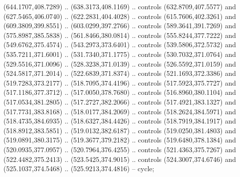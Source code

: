 \begin{scope}[shift={(407.03862,-246.29561)}]
    (644.1707,408.7289) .. (638.3173,408.1169) .. controls (632.8709,407.5577) and
    (627.5465,406.0740) .. (622.2831,404.4028) .. controls (615.7606,402.3261) and
    (609.3809,399.8551) .. (603.0299,397.2766) .. controls (589.3641,391.7269) and
    (575.8987,385.5838) .. (561.8466,380.0814) .. controls (555.8244,377.7222) and
    (549.6762,375.4574) .. (543.2973,373.6401) .. controls (539.5806,372.5732) and
    (535.7211,371.6001) .. (531.7340,371.1775) .. controls (530.7032,371.0764) and
    (529.5516,371.0096) .. (528.3238,371.0139) .. controls (526.5592,371.0159) and
    (524.5817,371.2014) .. (522.6839,371.8374) .. controls (521.1693,372.3386) and
    (519.7283,373.2177) .. (518.7095,374.4196) .. controls (517.5923,375.7727) and
    (517.1186,377.3712) .. (517.0050,378.7680) .. controls (516.8960,380.1104) and
    (517.0534,381.2805) .. (517.2727,382.2066) .. controls (517.4921,383.1327) and
    (517.7731,383.8168) .. (518.0177,384.2069) .. controls (518.2624,384.5971) and
    (518.4735,384.6935) .. (518.6327,384.4426) .. controls (518.7919,384.1917) and
    (518.8912,383.5851) .. (519.0132,382.6187) .. controls (519.0250,381.4803) and
    (519.0891,380.3175) .. (519.3677,379.2182) .. controls (519.6480,378.1384) and
    (520.0935,377.0957) .. (520.7964,376.4255) .. controls (521.4363,375.7267) and
    (522.4482,375.2413) .. (523.5425,374.9015) .. controls (524.3007,374.6746) and
    (525.1037,374.5468) .. (525.9213,374.4816) -- cycle;


\end{scope}
